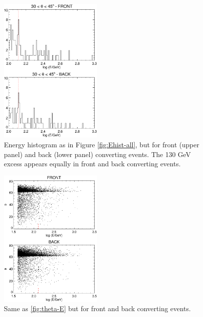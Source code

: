 \documentclass[aps,twocolumn,prd,superscriptaddress,showpacs,nofootinbib,fixfloat]{revtex4}
\begin{document}
\begin{figure}[p]
\centering
\includegraphics[width=0.45\textwidth]{plots/Ehist-frontback.ps}
\caption{Energy histogram as in Figure \ref{fig:Ehist-all}, but for front
  (upper panel) and back (lower panel) converting events.  The 130 GeV excess
  appears equally in front and back converting events. 
}
\label{fig:Ehist-frontback}
\end{figure}



\begin{figure}[p]
\centering
\includegraphics[width=0.45\textwidth]{plots/theta-E-frontback.ps}
\caption{Same as \ref{fig:theta-E} but for front and back converting events.}
\label{fig:theta-E-frontback}
\end{figure}
\end{document}
